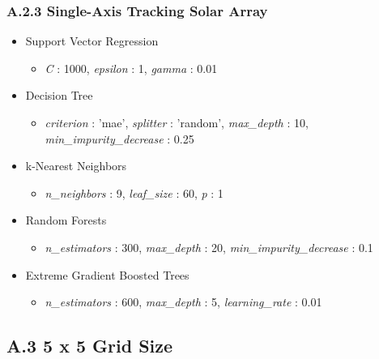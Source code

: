 \subsubsection*{A.2.3 \hspace{0.5em} Single-Axis Tracking Solar Array}
\begin{itemize}
    \item Support Vector Regression
    \begin{itemize}
        \item \textit{C} : 1000, \textit{epsilon} : 1,  \textit{gamma} : 0.01
    \end{itemize}

    \item Decision Tree 
    \begin{itemize}
        \item \textit{criterion} : 'mae', \textit{splitter} : 'random', \textit{max\_depth} : 10, \textit{min\_impurity\_decrease} : 0.25 
    \end{itemize}

    \item k-Nearest Neighbors 
    \begin{itemize}
        \item \textit{n\_neighbors} : 9, \textit{leaf\_size} : 60, \textit{p} : 1
    \end{itemize}

    \item Random Forests 
    \begin{itemize}
        \item \textit{n\_estimators} : 300, \textit{max\_depth} : 20, \textit{min\_impurity\_decrease} : 0.1
    \end{itemize}

    \item Extreme Gradient Boosted Trees
    \begin{itemize}
        \item \textit{n\_estimators} : 600, \textit{max\_depth} : 5, \textit{learning\_rate} : 0.01
    \end{itemize}

\end{itemize}

\subsection*{A.3 \hspace{0.5em} 5 x 5 Grid Size}

